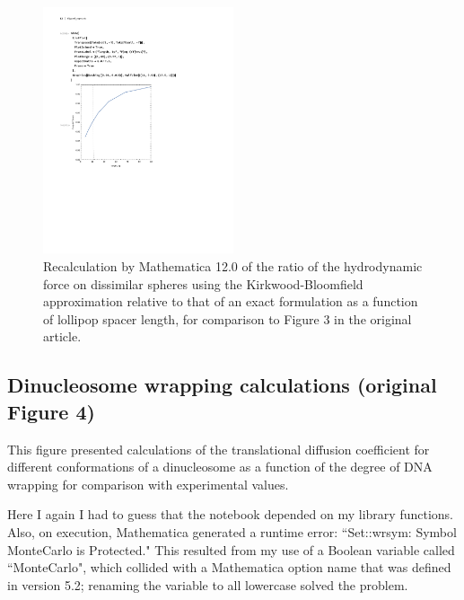 \begin{figure}[H]
\centering
\includegraphics[width=0.5\textwidth]{figs/figure3M12.pdf}
\caption{Recalculation by Mathematica 12.0 of the ratio of the hydrodynamic force on dissimilar spheres using the Kirkwood-Bloomfield approximation relative to that of an exact formulation as a function of lollipop spacer length, for comparison to Figure 3 in the original article.}
\label{figure3}
\end{figure}


\subsection{Dinucleosome wrapping calculations (original Figure 4)}

This figure presented calculations of the translational diffusion coefficient for different conformations of a dinucleosome as a function of the degree of DNA wrapping for comparison with experimental values.

Here I again I had to guess that the notebook depended on my library functions. Also, on execution, Mathematica generated a runtime error: ``Set::wrsym: Symbol MonteCarlo is Protected." This resulted from my use of a Boolean variable called ``MonteCarlo", which collided with a Mathematica option name that was defined in version 5.2; renaming the variable to all lowercase solved the problem.

